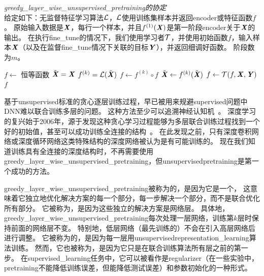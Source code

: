 \begin{algorithm}
\caption{ {\em \gls{greedy_layer_wise_unsupervised_pretraining}的协定}\\
给定如下：无监督特征学习算法$\mathcal{L}$，$\mathcal{L}$使用训练集样本并返回\gls{encoder}或特征函数$f$。
原始输入数据是$\boldsymbol{\mathit{X}}$，每行一个样本，并且$f^{(1)}(\boldsymbol{\mathit{X}})$是第一阶段\gls{encoder}关于$\boldsymbol{\mathit{X}}$的输出。
在执行\gls{fine_tune}的情况下，我们使用学习者$\mathcal{T}$，并使用初始函数$f$，输入样本$\boldsymbol{\mathit{X}}$（以及在监督\gls{fine_tune}情况下关联的目标$\boldsymbol{\mathit{Y}}$），并返回细调好函数。 阶段数为$m$。
}
\label{alg:pretraining}
\begin{algorithmic}
\STATE $f \leftarrow$ 恒等函数
\STATE $\tilde{\boldsymbol{\mathit{X}}} = \boldsymbol{\mathit{X}}$
  \STATE $f^{(k)} = {\mathcal{L}}(\tilde{\boldsymbol{\mathit{X}}})$
  \STATE $f \leftarrow f^{(k)} \circ f$
  \STATE $\tilde{\boldsymbol{\mathit{X}}} \leftarrow f^{(k)}(\tilde{\boldsymbol{\mathit{X}}})$
\ENDFOR
{}
  \STATE $f \leftarrow {\mathcal{T}}(f,\boldsymbol{\mathit{X}},\boldsymbol{\mathit{Y}})$
\ENDIF
{} $f$
\end{algorithmic}
\end{algorithm}


基于\gls{unsupervised}标准的贪心逐层训练过程，早已被用来规避\gls{supervised}问题中\gls{DNN}难以联合训练多层的问题。
这种方法至少可以追溯神经认知机~\citep{Fukushima75}。
深度学习的复兴始于2006年，源于发现这种贪心学习过程能够为多层联合训练过程找到一个好的初始值，甚至可以成功训练全连接的结构~\citep{Hinton06-small,Hinton-Science2006,HintonG2006,Bengio-nips-2006,ranzato-07-small}。
在此发现之前，只有深度卷积网络或深度循环网络这类特殊结构的深度网络被认为是有可能训练的。
现在我们知道训练具有全连接的深度结构时，不再需要使用\gls{greedy_layer_wise_unsupervised_pretraining}，但\gls{unsupervised}\gls{pretraining}是第一个成功的方法。


\gls{greedy_layer_wise_unsupervised_pretraining}被称为的，是因为它是一个，
这意味着它独立地优化解决方案的每一个部分，每一步解决一个部分，而不是联合优化所有部分。
它被称为，是因为这些独立的解决方案是网络层。
具体地，\gls{greedy_layer_wise_unsupervised_pretraining}每次处理一层网络，训练第$k$层时保持前面的网络层不变。
特别地，低层网络（最先训练的）不会在引入高层网络后进行调整。
它被称为的，是因为每一层用\gls{unsupervised}\gls{representation_learning}算法训练。
然而，它也被称为，是因为它只是在联合训练算法所有层之前的第一步。
在\gls{supervised_learning}任务中，它可以被看作是\gls{regularizer}（在一些实验中，\gls{pretraining}不能降低训练误差，但能降低测试误差）和参数初始化的一种形式。

